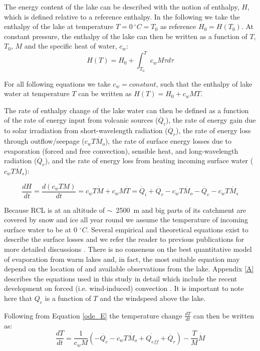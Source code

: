 \documentclass[doublespacing, linenumbers]{bmcart}
\begin{document}
The energy content of the lake can be described with the notion of enthalpy,
$H$, which is defined relative to a reference enthalpy. In the following we take
the enthalpy of the lake at temperature $T=0~^{\circ}C=T_0$ as reference
$H_0=H(T_0)$. At constant pressure, the enthalpy of the lake can then be written
as a function of $T$, $T_0$, $M$ and the specific heat of water, $c_w$:
\begin{equation}
	H(T) = H_0 + \int_{T_0}^{T}c_wM\tau d\tau
\end{equation}

For all following equations we take $c_w=constant$, such that the enthalpy of
lake water at temperature $T$ can be written as $H(T) = H_0 + c_wMT$.

The rate of enthalpy change of the lake water can then be defined as a function
of the rate of energy input from volcanic sources ($\dot{Q_i}$), the rate of
energy gain due to solar irradiation from short-wavelength radiation
($\dot{Q_r}$), the rate of energy loss through outflow/seepage
($c_wT\dot{M_o}$), the rate of surface energy losses due to evaporation (forced
and free convection), sensible heat, and long-wavelength radiation
($\dot{Q_e}$), and the rate of energy loss from heating incoming surface water
($c_wT\dot{M_s}$): 

\begin{equation}\label{ode_E}
    \frac{dH}{dt}=\frac{d(c_wTM)}{dt}=c_wT\dot{M} + c_wM\dot{T} =
	\dot{Q_i} + \dot{Q_r} - c_wT\dot{M_o} - \dot{Q_e} - c_wT\dot{M_s} 
\end{equation}
      
Because RCL is at an altitude of $\sim$~2500~m and big parts of its catchment
are covered by snow and ice all year round we assume the temperature of incoming
surface water to be at 0 $^{\circ}C$. Several empirical and theoretical equations exist
to describe the surface losses and we refer the reader to previous publications
for more detailed discussions \cite{Stevenson1992, hurstCraterLakeEnergy2015}.
There is no consensus on the best quantitative model of evaporation from warm
lakes and, in fact, the most suitable equation may depend on the location of and
available observations from the lake. Appendix \ref{A} describes the equations
used in this study in detail which include the recent development on forced
(i.e. wind-induced) convection \cite{sartoriCriticalReviewEquations2000}. It is
important to note here that $Q_e$ is a function of $T$ and the windspeed above
the lake. 

Following from Equation \ref{ode_E} the temperature change $\frac{dT}{dt}$ can
then be written as:
\begin{equation}\label{ode_T}
	\frac{dT}{dt}=\frac{1}{c_wM}\left(-\dot{Q_e} - c_wT\dot{M_o} + \dot{Q_{eff}} + \dot{Q_r}\right )
	-\frac{T}{M}\dot{M}
\end{equation}
\end{document}
